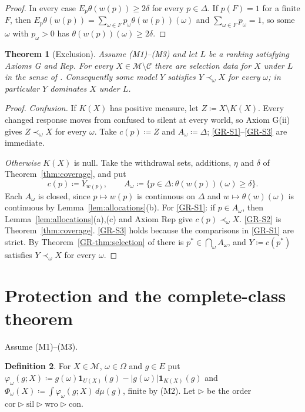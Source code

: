 \documentclass[11pt]{article}
\newcommand{\chg}[1]{{\color{red}#1}}
\newtheorem{theorem}{Theorem}[section]
\theoremstyle{definition}
\newtheorem{definition}[theorem]{Definition}
\theoremstyle{remark}
\newcommand{\M}{\mathcal M}
\newcommand{\C}{\mathcal C}
\newcommand{\one}{\mathbf 1}
\newcommand{\cor}{\mathrm{cor}}
\newcommand{\sil}{\mathrm{sil}}
\newcommand{\wro}{\mathrm{wro}}
\newcommand{\con}{\mathrm{con}}
\begin{document}
\begin{proof}
In every case $E_p\theta(w(p))\ge2\delta$ for every $p\in\Delta$. If $p(F)=1$ for a finite $F$, then $E_p\theta(w(p))=\sum_{\omega\in F}p_\omega\theta(w(p))(\omega)$ and $\sum_{\omega\in F}p_\omega=1$, so some $\omega$ with $p_\omega>0$ has $\theta(w(p))(\omega)\ge2\delta$.
\end{proof}

\begin{theorem}[Exclusion]\label{thm:exclusion}
Assume (M1)--(M3) and let $L$ be a ranking satisfying Axioms G and Rep. For every $X\in\M\setminus\C$ there are selection data for $X$ under $L$ in the sense of \cite[Definition~\ref{GR-def:selection-data}]{KonekGR}. Consequently some model $Y$ satisfies $Y\prec_\omega X$ for every $\omega$; in particular $Y$ dominates $X$ under $L$.
\end{theorem}
\begin{proof}
\emph{Confusion.} If $K(X)$ has positive measure, let $Z\coloneqq X\setminus K(X)$. Every changed response moves from confused to silent at every world, so Axiom G(ii) gives $Z\prec_\omega X$ for every $\omega$. Take $c(p)\coloneqq Z$ and $A_\omega\coloneqq\Delta$; \ref{GR-S1}--\ref{GR-S3} are immediate.

\emph{Otherwise} $K(X)$ is null. Take the withdrawal sets, additions, $\eta$ and $\delta$ of Theorem~\ref{thm:coverage}, and put
\[
c(p)\coloneqq Y_{w(p)},\qquad A_\omega\coloneqq\{p\in\Delta:\theta(w(p))(\omega)\ge\delta\}.
\]
Each $A_\omega$ is closed, since $p\mapsto w(p)$ is continuous on $\Delta$ and $w\mapsto\theta(w)(\omega)$ is continuous by Lemma~\ref{lem:allocations}(b). For \ref{GR-S1}: if $p\in A_\omega$, then Lemma~\ref{lem:allocations}(a),(c) and Axiom Rep give $c(p)\prec_\omega X$. \ref{GR-S2} is Theorem~\ref{thm:coverage}. \chg{\ref{GR-S3} holds because the comparisons in \ref{GR-S1} are strict.} By Theorem~\ref{GR-thm:selection} of \cite{KonekGR} there is $p^*\in\bigcap_\omega A_\omega$, and $Y\coloneqq c(p^*)$ satisfies $Y\prec_\omega X$ for every $\omega$.
\end{proof}

\section{Protection and the complete-class theorem}\label{sec:protection}

Assume (M1)--(M3).

\begin{definition}\label{def:Phi}
For $X\in\M$, $\omega\in\Omega$ and $g\in E$ put $\varphi_\omega(g;X)\coloneqq g(\omega)\one_{U(X)}(g)-|g(\omega)|\one_{K(X)}(g)$ and $\Phi_\omega(X)\coloneqq\int\varphi_\omega(g;X)\,d\mu(g)$, finite by (M2). Let $\rhd$ be the order $\cor\rhd\sil\rhd\wro\rhd\con$.
\end{definition}
\end{document}
